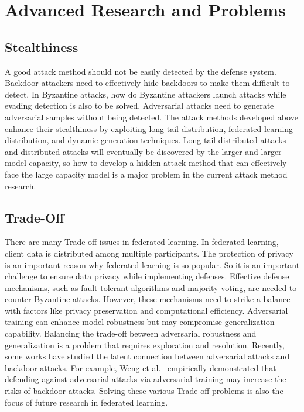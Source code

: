 \section{Advanced Research and Problems}
\label{Advanced Research and Problems}
\subsection{Stealthiness}

A good attack method should not be easily detected by
the defense system. Backdoor attackers need to effectively
hide backdoors to make them diﬀicult to detect. In
Byzantine attacks, how do Byzantine attackers launch
attacks while evading detection is also to be solved.
Adversarial attacks need to generate adversarial samples
without being detected. The attack methods developed
above enhance their stealthiness by exploiting long-tail
distribution, federated learning distribution, and dynamic
generation techniques. Long tail distributed attacks and
distributed attacks will eventually be discovered by the
larger and larger model capacity, so how to develop a
hidden attack method that can effectively face the large
capacity model is a major problem in the current attack
method research.   

\subsection{Trade-Off}
There are many Trade-off issues in federated learning.
In federated learning, client data is distributed among
multiple participants. The protection of privacy is an
important reason why federated learning is so popular.
So it is an important challenge to ensure data privacy
while implementing defenses. Effective defense
mechanisms, such as fault-tolerant algorithms and majority
voting, are needed to counter Byzantine attacks. However,
these mechanisms need to strike a balance with factors
like privacy preservation and computational eﬀiciency.
Adversarial training can enhance model robustness but
may compromise generalization capability. Balancing the
trade-off between adversarial robustness and
generalization is a problem that requires exploration and resolution.
Recently, some works have studied the latent connection
between adversarial attacks and backdoor attacks. For
example, Weng et al.~\cite{weng2020trade} empirically demonstrated that
defending against adversarial attacks via adversarial
training may increase the risks of backdoor attacks. Solving
these various Trade-off problems is also the focus of future
research in federated learning.


